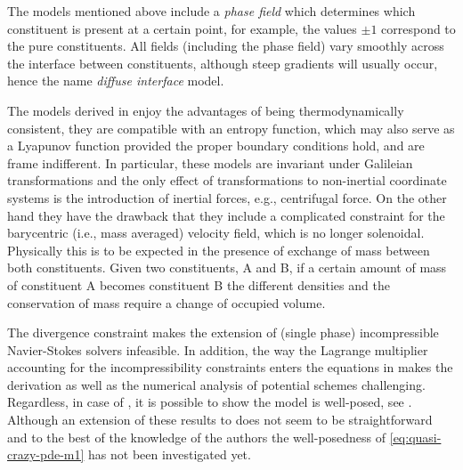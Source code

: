 \documentclass[final]{amsart}
\numberwithin{equation}{section}
\begin{document}
The models mentioned above include a \emph{phase field} which
determines which constituent is present at a certain point, for
example, the values $\pm 1$ correspond to the pure constituents.  All
fields (including the phase field) vary smoothly across the interface
between constituents, although steep gradients will usually
occur, hence the name \emph{diffuse interface} model. 

The models derived in \cite{LT98,ADGK} enjoy the advantages of being
thermodynamically consistent, \ie they are compatible with an
entropy function, which may also serve as a Lyapunov function provided
the proper boundary conditions hold, and are frame indifferent.  In
particular, these models are invariant under Galileian transformations
and the only effect of transformations to non-inertial
 coordinate systems is the introduction
of inertial forces, e.g., centrifugal force.  On the other hand they
have the drawback that they include a complicated constraint for the
barycentric (i.e., mass averaged) velocity field, which is no longer solenoidal.
Physically this is to be expected in the presence of exchange of mass
between both constituents. Given two constituents, A and B, if a
certain amount of mass of constituent A becomes constituent B the
different densities and the conservation of mass require a change of
occupied volume.

The divergence constraint makes the extension of (single phase)
incompressible Navier-Stokes solvers infeasible. In addition, the way
the Lagrange multiplier accounting for the incompressibility
constraints enters the equations in \cite{LT98,ADGK} makes the
derivation as well as the numerical analysis of potential schemes
challenging. Regardless, in case of \cite{LT98}, it is possible to
show the model is well-posed, see \cite{Abe09,Abe12}. Although an
extension of these results to \cite{ADGK} does not seem to be
straightforward and to the best of the knowledge of the
authors the well-posedness of \eqref{eq:quasi-crazy-pde-m1} has not
been investigated yet.
\end{document}
